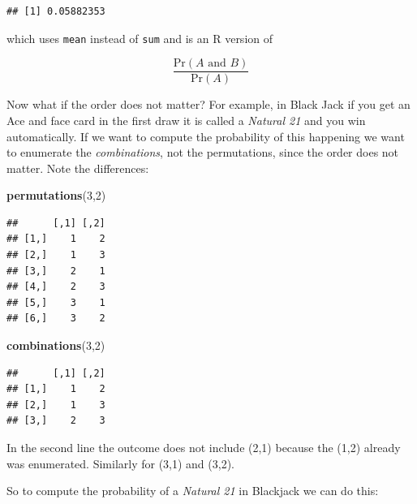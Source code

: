 \documentclass[
  openany]{book}
\newenvironment{Shaded}{\begin{snugshade}}{\end{snugshade}}
\newcommand{\DecValTok}[1]{\textcolor[rgb]{0.00,0.00,0.81}{#1}}
\newcommand{\KeywordTok}[1]{\textcolor[rgb]{0.13,0.29,0.53}{\textbf{#1}}}
\newcommand{\NormalTok}[1]{#1}
\begin{document}
\begin{verbatim}
## [1] 0.05882353
\end{verbatim}

which uses \texttt{mean} instead of \texttt{sum} and is an R version of

\[
\frac{\mbox{Pr}(A \mbox{ and } B)}{ \mbox{Pr}(A)}
\]

Now what if the order does not matter? For example, in Black Jack if you get an Ace and face card in the first draw it is called a \emph{Natural 21} and you win automatically. If we want to compute the probability of this happening we want to enumerate the \emph{combinations}, not the permutations, since the order does not matter. Note the differences:

\begin{Shaded}
\begin{Highlighting}[]
\KeywordTok{permutations}\NormalTok{(}\DecValTok{3}\NormalTok{,}\DecValTok{2}\NormalTok{)}
\end{Highlighting}
\end{Shaded}

\begin{verbatim}
##      [,1] [,2]
## [1,]    1    2
## [2,]    1    3
## [3,]    2    1
## [4,]    2    3
## [5,]    3    1
## [6,]    3    2
\end{verbatim}

\begin{Shaded}
\begin{Highlighting}[]
\KeywordTok{combinations}\NormalTok{(}\DecValTok{3}\NormalTok{,}\DecValTok{2}\NormalTok{)}
\end{Highlighting}
\end{Shaded}

\begin{verbatim}
##      [,1] [,2]
## [1,]    1    2
## [2,]    1    3
## [3,]    2    3
\end{verbatim}

In the second line the outcome does not include (2,1) because the (1,2) already was enumerated. Similarly for (3,1) and (3,2).

So to compute the probability of a \emph{Natural 21} in Blackjack we can do this:
\end{document}
